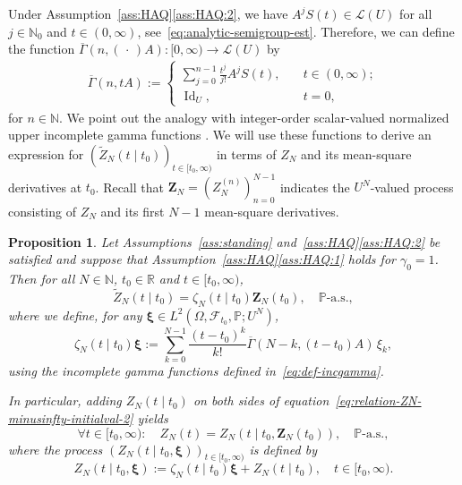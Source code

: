 \documentclass[reqno]{amsart}
\numberwithin{equation}{section}
\newcommand{\bbP}{\mathbb{P}}
\newcommand{\bbR}{\mathbb{R}}
\newcommand{\N}{\mathbb{N}}
\newcommand{\cF}{\mathcal{F}}
\newcommand{\from}{\colon}
\newcommand{\id}{\operatorname{Id}}
\newtheorem{proposition}[lemma]{Proposition}
\theoremstyle{remark}
\theoremstyle{definition}
\begin{document}
Under Assumption~\ref{ass:HAQ}\ref{ass:HAQ:2}, we have
$A^j S(t) \in \mathscr L(U)$ 
for all $j \in \N_0$ and $t \in (0,\infty)$, see~\eqref{eq:analytic-semigroup-est}.
Therefore, we can define the function
$\overline\Gamma(n, (\,\cdot\,) A) \from [0,\infty) \to \mathscr L(U)$ by
%
\begin{equation}\label{eq:def-incgamma}
	\begin{aligned}
		\overline\Gamma(n, tA) 
		:= 
		\begin{cases}
			\sum_{j=0}^{n-1} \frac{t^j}{j!} A^j S(t), \quad &t \in (0,\infty); \\
			\id_U, \quad &t = 0,
		\end{cases}
	\end{aligned}
\end{equation}
%
for $n \in \N$.
We point out the analogy with integer-order scalar-valued normalized
upper incomplete gamma functions \cite[Equations~(8.4.10) and~(8.4.11)]{Olver2010}.
We will use these functions to derive an expression
for $(\widetilde Z_N(t \mid t_0))_{t\in[t_0, \infty)}$
in terms of $Z_N$ and its mean-square derivatives at $t_0$.
Recall that $\mathbf Z_N = (Z_N^{(n)})_{n=0}^{N-1}$ indicates
the $U^N$-valued process consisting of $Z_N$ and its first $N-1$ mean-square derivatives.
%
\begin{proposition}\label{prop:relation-ZN-initialvalue}
	Let Assumptions~\textup{\ref{ass:standing} and~\ref{ass:HAQ}\ref{ass:HAQ:2}} be satisfied
	and suppose that Assumption~\textup{\ref{ass:HAQ}\ref{ass:HAQ:1}} holds for $\gamma_0 = 1$.
	Then for all $N \in \N$, $t_0 \in \bbR$ and $t \in [t_0, \infty)$,
	\begin{equation}\label{eq:relation-ZN-minusinfty-initialval-2}
		\widetilde Z_N(t \mid t_0) 
		= 
		\zeta_N(t \mid t_0) \mathbf Z_N (t_0), 
		\quad
		\bbP\text{-a.s.},
	\end{equation}
	where we define,
	for any $\bm\xi \in L^2(\Omega, \cF_{t_0}, \bbP; U^N)$,
	\begin{equation}\label{eq:def-zetaN}
		\zeta_{N}(t \mid t_0)\bm\xi 
		:= 
		\sum_{k=0}^{N-1} \frac{(t-t_0)^k}{k!}
		\overline\Gamma(N-k, (t-t_0)A)\, \xi_k,
	\end{equation}
	using the incomplete gamma functions defined in~\eqref{eq:def-incgamma}.
	
	In particular, adding $Z_N(t \mid t_0)$ on both sides of equation~\eqref{eq:relation-ZN-minusinfty-initialval-2} yields
	\begin{equation}\label{eq:infinite-time-process-as-finite-time-process}
		\forall t \in [t_0, \infty) : \quad 
		Z_N(t) = Z_N(t \mid t_0, \mathbf Z_N(t_0)), \quad \bbP\text{-a.s.},
	\end{equation}
	where the process $(Z_N(t \mid t_0, \bm\xi))_{t \in [t_0, \infty)}$ is defined by
	\begin{equation}
		\label{eq:def-Zt0xi}
		Z_N(t \mid t_0, \bm{\xi}) 
		:= 
		\zeta_{N}(t \mid t_0)\bm\xi
		+
		Z_N(t \mid t_0), 
		\quad 
		t \in [t_0, \infty).
	\end{equation}
\end{proposition}
\end{document}
